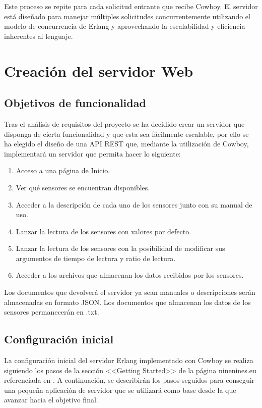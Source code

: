 Este proceso se repite para cada solicitud entrante que recibe Cowboy. El servidor está diseñado para manejar múltiples solicitudes concurrentemente utilizando el modelo de concurrencia de Erlang y aprovechando la escalabilidad y eficiencia inherentes al lenguaje.

\cleardoublepage


\section{Creación del servidor Web}

\subsection{Objetivos de funcionalidad}

Tras el análisis de requisitos del proyecto se ha decidido crear un servidor que disponga de cierta funcionalidad y que esta sea fácilmente escalable, por ello se ha elegido el diseño de una API REST que, mediante la utilización de Cowboy, implementará un servidor que permita hacer lo siguiente:

\begin{enumerate}
    \item Acceso a una página de Inicio.
    \item Ver qué sensores se encuentran disponibles.
    \item Acceder a la descripción de cada uno de los sensores junto con su manual de uso.
    \item Lanzar la lectura de los sensores con valores por defecto.
    \item Lanzar la lectura de los sensores con la posibilidad de modificar sus argumentos de tiempo de lectura y ratio de lectura.
    \item Acceder a los archivos que almacenan los datos recibidos por los sensores.
\end{enumerate}

Los documentos que devolverá el servidor ya sean manuales o descripciones serán almacenadas en formato JSON. Los documentos que almacenan los datos de los sensores permanecerán en .txt.


\subsection{Configuración inicial}%
\label{sec:ConfigCowboy}

La configuración inicial del servidor Erlang implementado con Cowboy se realiza siguiendo los pasos de la sección <<Getting Started>> de la página ninenines.eu referenciada en \cite{Nines2012}. A continuación, se describirán los pasos seguidos para conseguir una pequeña aplicación de servidor que se utilizará como base desde la que avanzar hacia el objetivo final.

